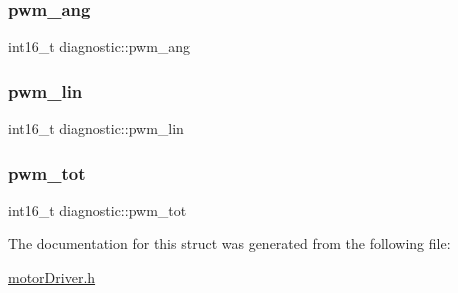 \mbox{\label{structdiagnostic_a58a1c02e90d32275784de03f86efa0af}} 
\subsubsection{\texorpdfstring{pwm\_ang}{pwm\_ang}}
{\footnotesize\ttfamily int16\+\_\+t diagnostic\+::pwm\+\_\+ang}

\mbox{\label{structdiagnostic_a65b4e8ea97a29c15f20a4b1c15f69917}} 
\subsubsection{\texorpdfstring{pwm\_lin}{pwm\_lin}}
{\footnotesize\ttfamily int16\+\_\+t diagnostic\+::pwm\+\_\+lin}

\mbox{\label{structdiagnostic_a5c8156e4aa730082e44fe16efff0d7bc}} 
\subsubsection{\texorpdfstring{pwm\_tot}{pwm\_tot}}
{\footnotesize\ttfamily int16\+\_\+t diagnostic\+::pwm\+\_\+tot}



The documentation for this struct was generated from the following file\+:\begin{DoxyCompactItemize}
\item 
\mbox{\hyperlink{motorDriver_8h}{motor\+Driver.\+h}}\end{DoxyCompactItemize}
